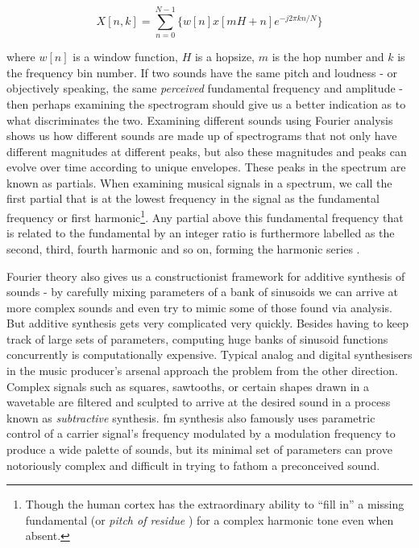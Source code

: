 {{\begin{equation}
\label{eq:stft}
X[n,k] = \sum_{n=0}^{N-1}\{w[n]x[mH+n]e^{-j2\pi kn/N}\}
\end{equation}

where $w[n]$ is a window function, $H$ is a hopsize, $m$ is the hop number and $k$ is the frequency bin number. If two sounds have the same pitch and loudness - or objectively speaking, the same \textit{perceived} fundamental frequency and amplitude - then perhaps examining the spectrogram should give us a better indication as to what discriminates the two. Examining different sounds using Fourier analysis shows us how different sounds are made up of spectrograms that not only have different magnitudes at different peaks, but also these magnitudes and peaks can evolve over time according to unique envelopes. These peaks in the spectrum are known as partials. When examining musical signals in a spectrum, we call the first partial that is at the lowest frequency in the signal as the fundamental frequency or first harmonic\footnote{Though the human cortex has the extraordinary ability to ``fill in'' a missing fundamental (or \textit{pitch of residue} \citep{Weihs2009}) for a complex harmonic tone even when absent.}. Any partial above this fundamental frequency that is related to the fundamental by an integer ratio is furthermore labelled as the second, third, fourth harmonic and so on, forming the harmonic series \citep{Puckette2006}.

Fourier theory also gives us a constructionist framework for additive synthesis of sounds - by carefully mixing parameters of a bank of sinusoids we can arrive at more complex sounds and even try to mimic some of those found via analysis. But additive synthesis gets very complicated very quickly. Besides having to keep track of large sets of parameters, computing huge banks of sinusoid functions concurrently is computationally expensive. Typical analog and digital synthesisers in the music producer's arsenal approach the problem from the other direction. Complex signals such as squares, sawtooths, or certain shapes drawn in a wavetable are filtered and sculpted to arrive at the desired sound in a process known as \textit{subtractive} synthesis. \acrfull{fm} synthesis also famously uses parametric control of a carrier signal's frequency modulated by a modulation frequency to produce a wide palette of sounds, but its minimal set of parameters can prove notoriously complex and difficult in trying to fathom a preconceived sound. 
 
}}
